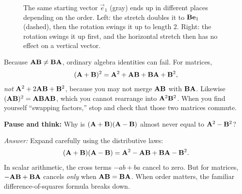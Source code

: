 \begin{figure}[H]
\centering
{}
\caption{The same starting vector $\vec{e}_1$ (gray) ends up in different places
depending on the order. Left: the stretch doubles it to $\mathbf{B}\mathbf{e}_1$ (dashed),
then the rotation swings it up to length $2$. Right: the rotation swings it up first,
and the horizontal stretch then has no effect on a vertical vector.}
\label{ch08:noncommute}
\end{figure}

\begin{trapbox}
Because $\mathbf{A}\mathbf{B} \ne \mathbf{B}\mathbf{A}$, ordinary algebra identities can fail. For
matrices,
\[
(\mathbf{A}+\mathbf{B})^2 = \mathbf{A}^2 + \mathbf{A}\mathbf{B} + \mathbf{B}\mathbf{A} + \mathbf{B}^2,
\]
\emph{not} $\mathbf{A}^2 + 2\mathbf{A}\mathbf{B} + \mathbf{B}^2$, because you may not merge
$\mathbf{A}\mathbf{B}$ with $\mathbf{B}\mathbf{A}$. Likewise $(\mathbf{A}\mathbf{B})^2 = \mathbf{A}\mathbf{B}\mathbf{A}\mathbf{B}$, which you cannot rearrange into $\mathbf{A}^2\mathbf{B}^2$. When you find
yourself ``swapping factors,'' stop and check that those two matrices commute.
\end{trapbox}

\begin{recoverybox}
\textbf{Pause and think:} Why is $(\mathbf{A}+\mathbf{B})(\mathbf{A}-\mathbf{B})$ almost never equal to
$\mathbf{A}^2 - \mathbf{B}^2$?

\emph{Answer:} Expand carefully using the distributive laws:
\[
(\mathbf{A}+\mathbf{B})(\mathbf{A}-\mathbf{B}) = \mathbf{A}^2 - \mathbf{A}\mathbf{B} + \mathbf{B}\mathbf{A} - \mathbf{B}^2.
\]
In scalar arithmetic, the cross terms $-ab + ba$ cancel to zero. But for matrices,
$-\mathbf{A}\mathbf{B} + \mathbf{B}\mathbf{A}$ cancels \emph{only} when $\mathbf{A}\mathbf{B} = \mathbf{B}\mathbf{A}$.
When order matters, the familiar difference-of-squares formula breaks down.
\end{recoverybox}

